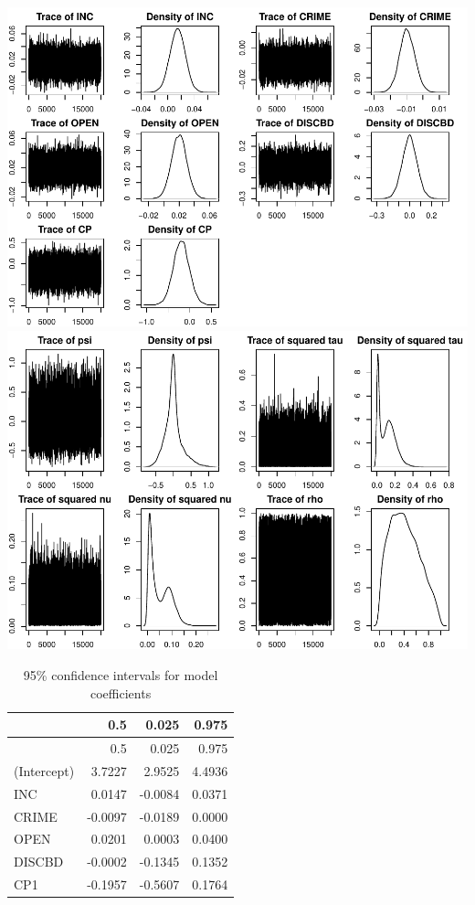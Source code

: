 \documentclass[
]{article}
\begin{document}
\includegraphics{midterm-project_files/figure-latex/unnamed-chunk-44-1.pdf}
\includegraphics{midterm-project_files/figure-latex/unnamed-chunk-44-2.pdf}

\begin{longtable}[]{@{}lrrr@{}}
\caption{95\% confidence intervals for model
coefficients}\tabularnewline
\toprule
& 0.5 & 0.025 & 0.975 \\
\midrule
\endfirsthead
\toprule
& 0.5 & 0.025 & 0.975 \\
\midrule
\endhead
(Intercept) & 3.7227 & 2.9525 & 4.4936 \\
INC & 0.0147 & -0.0084 & 0.0371 \\
CRIME & -0.0097 & -0.0189 & 0.0000 \\
OPEN & 0.0201 & 0.0003 & 0.0400 \\
DISCBD & -0.0002 & -0.1345 & 0.1352 \\
CP1 & -0.1957 & -0.5607 & 0.1764 \\
\bottomrule
\end{longtable}
\end{document}

